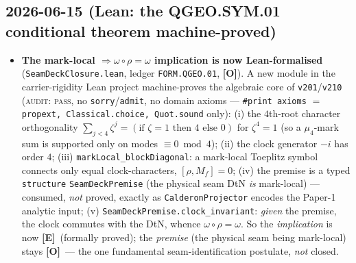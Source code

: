 \documentclass[11pt]{article}
\providecommand{\mE}{\textbf{[E]}}\providecommand{\mC}{\textbf{[C]}}
\providecommand{\mO}{\textbf{[O]}}\providecommand{\mX}{\textbf{[X]}}
\begin{document}
\subsection*{2026-06-15 (Lean: the QGEO.SYM.01 conditional theorem machine-proved)}
\begin{itemize}
\item \textbf{The mark-local $\Rightarrow\omega\circ\rho=\omega$ implication is now Lean-formalised}
  (\texttt{SeamDeckClosure.lean}, ledger \texttt{FORM.QGEO.01}, \mO). A new module in the
  carrier-rigidity Lean project machine-proves the algebraic core of \texttt{v201}/\texttt{v210}
  (\textsc{audit: pass}, no \texttt{sorry}/\texttt{admit}, no domain axioms --- \texttt{\#print axioms} $=$
  \texttt{propext, Classical.choice, Quot.sound} only): (i) the $4$th-root character orthogonality
  $\sum_{j<4}\zeta^j=(\text{if }\zeta{=}1\text{ then }4\text{ else }0)$ for $\zeta^4{=}1$ (so a $\mu_4$-mark
  sum is supported only on modes $\equiv0\bmod4$); (ii) the clock generator $-i$ has order $4$;
  (iii) \texttt{markLocal\_blockDiagonal}: a mark-local Toeplitz symbol connects only equal clock-characters,
  $[\rho,M_f]=0$; (iv) the premise is a typed \texttt{structure} \texttt{SeamDeckPremise} (the physical seam
  DtN \emph{is} mark-local) --- consumed, \emph{not} proved, exactly as \texttt{CalderonProjector} encodes the
  Paper-1 analytic input; (v) \texttt{SeamDeckPremise.clock\_invariant}: \emph{given} the premise, the clock
  commutes with the DtN, whence $\omega\circ\rho=\omega$. So the \emph{implication} is now \mE\ (formally
  proved); the \emph{premise} (the physical seam being mark-local) stays \mO\ --- the one fundamental
  seam-identification postulate, \emph{not} closed.
\end{itemize}
\end{document}
